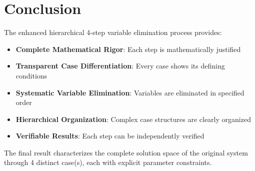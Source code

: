 \documentclass{article}
\begin{document}
\section{Conclusion}

The enhanced hierarchical 4-step variable elimination process provides:
\begin{itemize}
\item \textbf{Complete Mathematical Rigor}: Each step is mathematically justified
\item \textbf{Transparent Case Differentiation}: Every case shows its defining conditions
\item \textbf{Systematic Variable Elimination}: Variables are eliminated in specified order
\item \textbf{Hierarchical Organization}: Complex case structures are clearly organized
\item \textbf{Verifiable Results}: Each step can be independently verified
\end{itemize}

The final result characterizes the complete solution space of the original system
through 4 distinct case(s), each with explicit parameter constraints.
\end{document}
